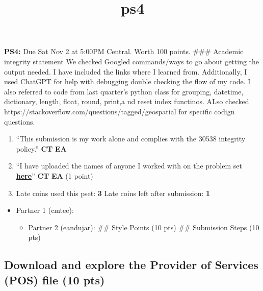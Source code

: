 \documentclass[
  letterpaper,
  DIV=11,
  numbers=noendperiod]{scrartcl}
\title{ps4}
\author{}
\date{}
\providecommand{\tightlist}{%
  \setlength{\itemsep}{0pt}\setlength{\parskip}{0pt}}\usepackage{longtable,booktabs,array}
\begin{document}
\maketitle



\textbf{PS4:} Due Sat Nov 2 at 5:00PM Central. Worth 100 points. \#\#\#
Academic integrity statement We checked Googled commands/ways to go
about getting the output needed. I have included the links where I
learned from. Additionally, I used ChatGPT for help with debugging
double checking the flow of my code. I also referred to code from last
quarter's python class for grouping, datetime, dictionary, length,
float, round, print,a nd reset index functinos. ALso checked
https://stackoverflow.com/questions/tagged/geospatial for specific
codign questions.

\begin{enumerate}
\def\labelenumi{\arabic{enumi}.}
\tightlist
\item
  ``This submission is my work alone and complies with the 30538
  integrity policy.'' \textbf{CT} \textbf{EA}
\item
  ``I have uploaded the names of anyone I worked with on the problem set
  \textbf{\href{https://docs.google.com/forms/d/1-zzHx762odGlpVWtgdIC55vqF-j3gqdAp6Pno1rIGK0/edit}{here}}''
  \textbf{CT} \textbf{EA} (1 point)
\item
  Late coins used this pset: \textbf{3} Late coins left after
  submission: \textbf{1}
\end{enumerate}

\begin{itemize}
\tightlist
\item
  Partner 1 (cmtee):

  \begin{itemize}
  \tightlist
  \item
    Partner 2 (eandujar): \#\# Style Points (10 pts) \#\# Submission
    Steps (10 pts)
  \end{itemize}
\end{itemize}

\subsection{Download and explore the Provider of Services (POS) file (10
pts)}\label{download-and-explore-the-provider-of-services-pos-file-10-pts}
\end{document}
